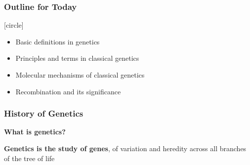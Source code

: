 \documentclass{beamer}
\begin{document}
\begin{frame}
		\frametitle{Outline for Today}
[circle]
\Large{
			\begin{itemize} 
			\item Basic definitions in genetics
			\item Principles and terms in classical genetics
			\item Molecular mechanisms of classical genetics
			\item Recombination and its significance
		\end{itemize}
	}

\end{frame}

\begin{frame}
\frametitle{History of Genetics}

\Large \textbf{What is genetics?} \par

\bigskip
\pause
\Large \textbf{Genetics is the study of genes}, of variation and heredity across all branches of the tree of life




\end{frame}
\end{document}
